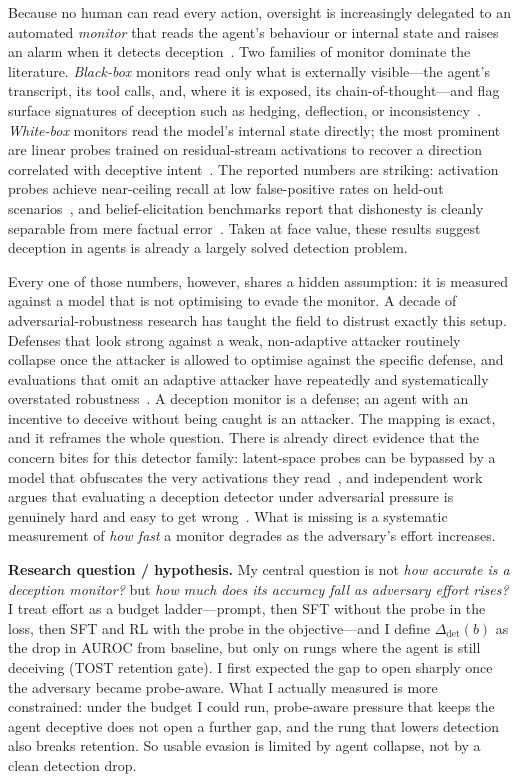 \documentclass{webofc}
\begin{document}
Because no human can read every action, oversight is increasingly delegated to
an automated \emph{monitor} that reads the agent's behaviour or internal state
and raises an alarm when it detects deception~\cite{greenblatt2023}. Two families
of monitor dominate the literature. \emph{Black-box} monitors read only what is
externally visible---the agent's transcript, its tool calls, and, where it is
exposed, its chain-of-thought---and flag surface signatures of deception such
as hedging, deflection, or inconsistency~\cite{baker2025}. \emph{White-box}
monitors read the model's internal state directly; the most prominent are linear
probes trained on residual-stream activations to recover a direction correlated
with deceptive intent~\cite{goldowskydill2025,zou2023}. The reported numbers are
striking: activation probes achieve near-ceiling recall at low false-positive
rates on held-out scenarios~\cite{parrack2025}, and belief-elicitation benchmarks
report that dishonesty is cleanly separable from mere factual
error~\cite{ren2025mask}. Taken at face value, these results suggest deception in
agents is already a largely solved detection problem.

Every one of those numbers, however, shares a hidden assumption: it is measured
against a model that is not optimising to evade the monitor. A decade of
adversarial-robustness research has taught the field to distrust exactly this
setup. Defenses that look strong against a weak, non-adaptive attacker
routinely collapse once the attacker is allowed to optimise against the
specific defense, and evaluations that omit an adaptive attacker have
repeatedly and systematically overstated
robustness~\cite{carlini2019,athalye2018,tramer2020}. A deception monitor is a
defense; an agent with an incentive to deceive without being caught is an
attacker. The mapping is exact, and it reframes the whole question. There is
already direct evidence that the concern bites for this detector family:
latent-space probes can be bypassed by a model that obfuscates the very
activations they read~\cite{bailey2024}, and independent work argues that
evaluating a deception detector under adversarial pressure is genuinely
hard and easy to get wrong~\cite{smith2025}. What is missing is a systematic
measurement of \emph{how fast} a monitor degrades as the adversary's effort
increases.

\textbf{Research question / hypothesis.} My central question is not
\emph{how accurate is a deception monitor?} but \emph{how much does its accuracy
fall as adversary effort rises?} I treat effort as a budget ladder---prompt,
then SFT without the probe in the loss, then SFT and RL with the probe in the
objective---and I define $\Delta_{\mathrm{det}}(b)$ as the drop in AUROC from
baseline, but only on rungs where the agent is still deceiving (TOST retention
gate). I first expected the gap to open sharply once the adversary became
probe-aware. What I actually measured is more constrained: under the budget I
could run, probe-aware pressure that keeps the agent deceptive does not open a
further gap, and the rung that lowers detection also breaks retention. So usable
evasion is limited by agent collapse, not by a clean detection drop.
\end{document}
